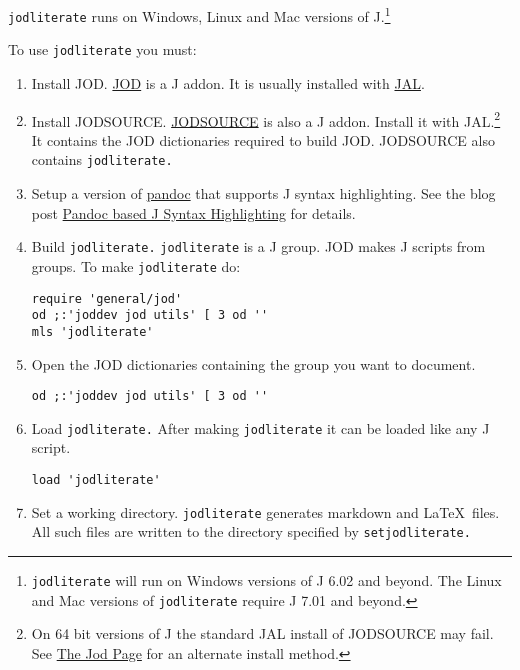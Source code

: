 \texttt{jodliterate} runs on Windows, Linux and Mac versions of
J.\footnote{\texttt{jodliterate} will run on Windows versions of J 6.02
  and beyond. The Linux and Mac versions of \texttt{jodliterate} require
  J 7.01 and beyond.}

To use \texttt{jodliterate} you must:

\begin{enumerate}[1.]
\item
  Install JOD.
  \href{http://www.jsoftware.com/jwiki/Addons/general/jod}{JOD} is a J
  addon. It is usually installed with
  \href{http://www.jsoftware.com/jwiki/JAL}{JAL}.
\item
  Install JODSOURCE.
  \href{http://www.jsoftware.com/jwiki/Addons/general/jodsource}{JODSOURCE}
  is also a J addon. Install it with JAL.\footnote{On 64 bit versions of
    J the standard JAL install of JODSOURCE may fail. See
    \href{http://bakerjd99.wordpress.com/the-jod-page/\#comment-210}{The
    Jod Page} for an alternate install method.} It contains the JOD
  dictionaries required to build JOD. JODSOURCE also contains
  \texttt{jodliterate.}
\item
  Setup a version of \href{http://johnmacfarlane.net/pandoc/}{pandoc}
  that supports J syntax highlighting. See the blog post
  \href{http://bakerjd99.wordpress.com/2012/09/20/pandoc-based-j-syntax-highlighting/}{Pandoc
  based J Syntax Highlighting} for details.
\item
  Build \texttt{jodliterate.} \texttt{jodliterate} is a J group. JOD
  makes J scripts from groups. To make \texttt{jodliterate} do:

\begin{verbatim}
require 'general/jod'
od ;:'joddev jod utils' [ 3 od ''
mls 'jodliterate'
\end{verbatim}
\item
  Open the JOD dictionaries containing the group you want to document.

\begin{verbatim}
od ;:'joddev jod utils' [ 3 od ''
\end{verbatim}
\item
  Load \texttt{jodliterate.} After making \texttt{jodliterate} it can be
  loaded like any J script.

\begin{verbatim}
load 'jodliterate'
\end{verbatim}
\item
  Set a working directory. \texttt{jodliterate} generates markdown and
  \LaTeX~files. All such files are written to the directory specified by
  \texttt{setjodliterate.}


\end{enumerate}
